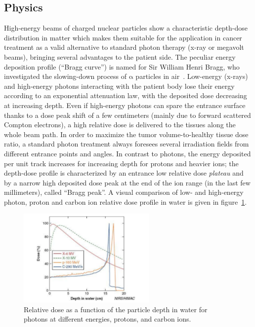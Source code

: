 \subsection{Physics}
High-energy beams of charged nuclear particles show a characteristic depth-dose distribution in matter which makes them suitable for the application in cancer treatment as a valid alternative to standard photon therapy (x-ray or megavolt beams), bringing several advantages to the patient side. The peculiar energy deposition profile (\enquote{Bragg curve}) is named for Sir William Henri Bragg, who investigated the slowing-down process of $\mathrm{\alpha}$ particles in air~\parencite{Bragg1904, Bragg1905}. Low-energy (x-rays) and high-energy photons interacting with the patient body lose their energy according to an exponential attenuation law, with the deposited dose decreasing at increasing depth. Even if high-energy photons can spare the entrance surface thanks to a dose peak shift of a few centimeters (mainly due to forward scattered Compton electrons), a high relative dose is delivered to the tissues along the whole beam path. In order to maximize the tumor volume-to-healthy tissue dose ratio, a standard photon treatment always foresees several irradiation fields from different entrance points and angles. In contrast to photons, the energy deposited per unit track increases for increasing depth for protons and heavier ions; the depth-dose profile is characterized by an entrance low relative dose \textit{plateau} and by a narrow high deposited dose peak at the end of the ion range (in the last few millimeters), called \enquote{Bragg peak}. A visual comparison of low- and high-energy photon, proton and carbon ion relative dose profile in water is given in figure~\ref{chap1::fig::Depth-doseProf}. 

\begin{figure}[!htbp]
\centering
\includegraphics[width=0.6\textwidth]{03_GraphicFiles/chapter1_Introduction/depthDoseProf.pdf}
\caption{Relative dose as a function of the particle depth in water for photons at different energies, protons, and carbon ions.}
\label{chap1::fig::Depth-doseProf}
\end{figure} 

